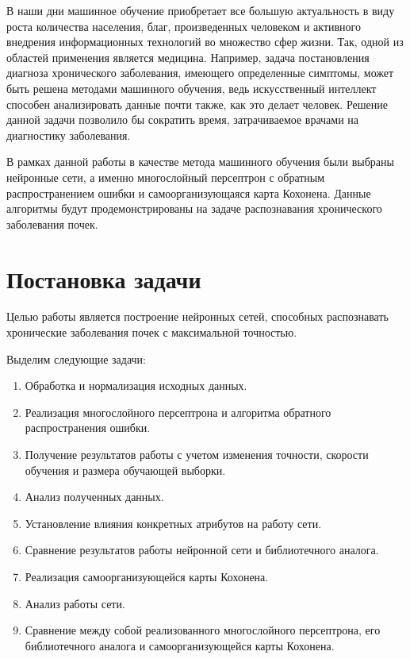 







\Intro

В наши дни машинное обучение приобретает все большую актуальность в виду роста количества населения, благ, произведенных человеком и активного внедрения информационных технологий во множество сфер жизни. Так, одной из областей применения является медицина. Например, задача постановления диагноза хронического заболевания, имеющего определенные симптомы, может быть решена методами машинного обучения, ведь искусственный интеллект способен анализировать данные почти также, как это делает человек. Решение данной задачи позволило бы сократить время, затрачиваемое врачами на диагностику заболевания.

В рамках данной работы в качестве метода машинного обучения были выбраны нейронные сети, а именно многослойный персептрон с обратным распространением ошибки и самоорганизующаяся карта Кохонена. Данные алгоритмы будут продемонстрированы на задаче распознавания хронического заболевания почек.

\newpage

\section{Постановка задачи}
Целью работы является построение нейронных сетей, способных распознавать хронические заболевания почек с максимальной точностью.

Выделим следующие задачи:

\begin{enumerate}
	\item
		Обработка и нормализация исходных данных.
	\item 
		Реализация многослойного персептрона и алгоритма обратного распространения ошибки.
	\item 
		Получение результатов работы с учетом изменения точности, скорости обучения и размера обучающей выборки. 
	\item 
		Анализ полученных данных.
	\item
		Установление влияния конкретных атрибутов на работу сети.
	\item 
		Сравнение результатов работы нейронной сети и библиотечного аналога.
	\item
		Реализация самоорганизующейся карты Кохонена.
	\item
		Анализ работы сети.
	\item
		Сравнение между собой реализованного многослойного персептрона, его библиотечного аналога и самоорганизующейся карты Кохонена.
\end{enumerate}
\newpage

